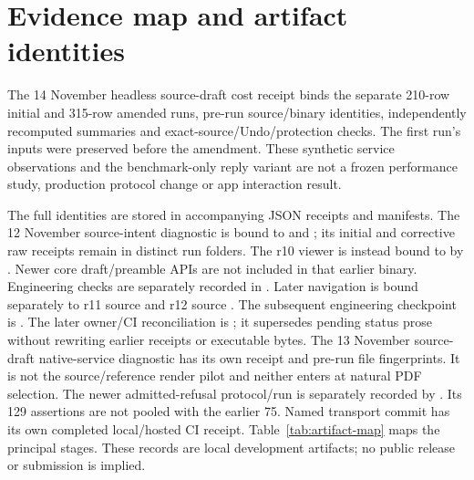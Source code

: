 \section{Evidence map and artifact identities}
\label{app:artifacts}
The 14 November headless source-draft cost receipt
 binds the separate
210-row initial and 315-row amended runs, pre-run source/binary identities,
independently recomputed summaries and exact-source/Undo/protection checks.
The first run's inputs were preserved before the amendment. These synthetic
service observations and the benchmark-only reply variant are not a frozen
performance study, production protocol change or app interaction result.

The full identities are stored in accompanying JSON receipts and manifests.
The 12 November source-intent diagnostic is bound to  and
; its initial and
corrective raw receipts remain in distinct run folders. The r10 viewer is
instead bound to  by
. Newer core
draft/preamble APIs are not included in that earlier binary. Engineering checks
are separately recorded in
.
Later navigation is bound separately to r11 source  and r12
source . The subsequent engineering checkpoint is .
The later owner/CI reconciliation is
; it supersedes pending
status prose without rewriting earlier receipts or executable bytes.
The 13 November source-draft native-service diagnostic has its own
 receipt and
pre-run file fingerprints. It is not the source/reference render pilot and
neither enters at natural PDF selection.
The newer admitted-refusal protocol/run is separately recorded by
. Its 129 assertions
are not pooled with the earlier 75. Named transport commit 
has its own completed local/hosted CI receipt.
Table~\ref{tab:artifact-map} maps the principal stages. These records are local
development artifacts; no public release or submission is implied.

